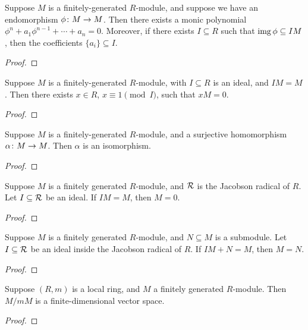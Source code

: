 \begin{lemma}
    Suppose \(M\) is a finitely-generated \(R\)-module,
    and suppose we have an endomorphism \(\phi\colon M\to M\).
    Then there exists a monic polynomial \(\phi^n + a_1\phi^{n-1} + \cdots + a_n = 0\).
    Moreover, if there exists \(I \subseteq R\) such that \(\operatorname{img}\phi \subseteq IM\),
    then the coefficients \(\{a_i\} \subseteq I\).
\end{lemma}
\begin{proof}
    
\end{proof}
\begin{corollary}
    Suppose \(M\) is a finitely-generated \(R\)-module,
    with \(I \subseteq R\) is an ideal, and \(IM = M\).
    Then there exists \(x \in R\), \(x \equiv 1\pmod{I}\), such that \(xM = 0\).
\end{corollary}
\begin{proof}
    
\end{proof}
\begin{corollary}
    Suppose \(M\) is a finitely-generated \(R\)-module,
    and a surjective homomorphism \(\alpha\colon M\to M\).
    Then \(\alpha\) is an isomorphism.
\end{corollary}
\begin{proof}
    
\end{proof}

\begin{theorem}
    Suppose \(M\) is a finitely generated \(R\)-module,
    and \(\mathcal{R}\) is the Jacobson radical of \(R\).
    Let \(I \subseteq \mathcal{R}\) be an ideal.
    If \(IM = M\), then \(M = 0\).
\end{theorem}
\begin{proof}
    
\end{proof}
\begin{corollary}
    Suppose \(M\) is a finitely generated \(R\)-module,
    and \(N \subseteq M\) is a submodule.
    Let \(I \subseteq \mathcal{R}\) be an ideal inside the Jacobson radical of \(R\).
    If \(IM + N = M\), then \(M = N\).
\end{corollary}
\begin{proof}
    
\end{proof}
\begin{corollary}
    Suppose \((R,m)\) is a local ring,
    and \(M\) a finitely generated \(R\)-module.
    Then \(M/mM\) is a finite-dimensional vector space.
\end{corollary}
\begin{proof}
    
\end{proof}

